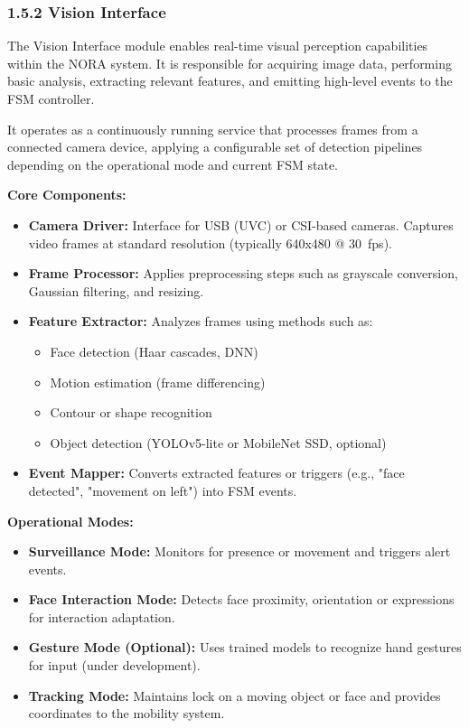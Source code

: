 \subsubsection*{1.5.2 Vision Interface}

The Vision Interface module enables real-time visual perception capabilities within the NORA system. It is responsible for acquiring image data, performing basic analysis, extracting relevant features, and emitting high-level events to the FSM controller.

It operates as a continuously running service that processes frames from a connected camera device, applying a configurable set of detection pipelines depending on the operational mode and current FSM state.

\vspace{0.5cm}

\noindent\textbf{Core Components:}
\begin{itemize}
    \item \textbf{Camera Driver:} Interface for USB (UVC) or CSI-based cameras. Captures video frames at standard resolution (typically 640x480 @ 30~fps).
    \item \textbf{Frame Processor:} Applies preprocessing steps such as grayscale conversion, Gaussian filtering, and resizing.
    \item \textbf{Feature Extractor:} Analyzes frames using methods such as:
    \begin{itemize}
        \item Face detection (Haar cascades, DNN)
        \item Motion estimation (frame differencing)
        \item Contour or shape recognition
        \item Object detection (YOLOv5-lite or MobileNet SSD, optional)
    \end{itemize}
    \item \textbf{Event Mapper:} Converts extracted features or triggers (e.g., "face detected", "movement on left") into FSM events.
\end{itemize}

\vspace{0.5cm}

\noindent\textbf{Operational Modes:}
\begin{itemize}
    \item \textbf{Surveillance Mode:} Monitors for presence or movement and triggers alert events.
    \item \textbf{Face Interaction Mode:} Detects face proximity, orientation or expressions for interaction adaptation.
    \item \textbf{Gesture Mode (Optional):} Uses trained models to recognize hand gestures for input (under development).
    \item \textbf{Tracking Mode:} Maintains lock on a moving object or face and provides coordinates to the mobility system.
\end{itemize}


